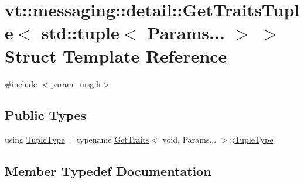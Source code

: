 \hypertarget{structvt_1_1messaging_1_1detail_1_1_get_traits_tuple_3_01std_1_1tuple_3_01_params_8_8_8_01_4_01_4}{}\section{vt\+:\+:messaging\+:\+:detail\+:\+:Get\+Traits\+Tuple$<$ std\+:\+:tuple$<$ Params... $>$ $>$ Struct Template Reference}
\label{structvt_1_1messaging_1_1detail_1_1_get_traits_tuple_3_01std_1_1tuple_3_01_params_8_8_8_01_4_01_4}


{\ttfamily \#include $<$param\+\_\+msg.\+h$>$}

\subsection*{Public Types}
\begin{DoxyCompactItemize}
\item 
using \hyperlink{structvt_1_1messaging_1_1detail_1_1_get_traits_tuple_3_01std_1_1tuple_3_01_params_8_8_8_01_4_01_4_a54beecbf30cc403de7f176508983f04d}{Tuple\+Type} = typename \hyperlink{structvt_1_1messaging_1_1detail_1_1_get_traits}{Get\+Traits}$<$ void, Params... $>$\+::\hyperlink{structvt_1_1messaging_1_1detail_1_1_get_traits_tuple_3_01std_1_1tuple_3_01_params_8_8_8_01_4_01_4_a54beecbf30cc403de7f176508983f04d}{Tuple\+Type}
\end{DoxyCompactItemize}


\subsection{Member Typedef Documentation}
\mbox{\label{structvt_1_1messaging_1_1detail_1_1_get_traits_tuple_3_01std_1_1tuple_3_01_params_8_8_8_01_4_01_4_a54beecbf30cc403de7f176508983f04d}} 
